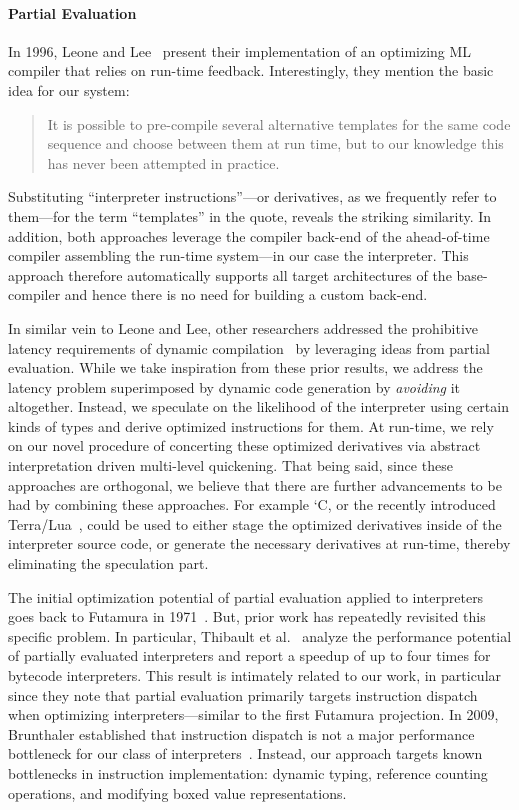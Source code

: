 \documentclass[preprint,10pt]{popl14conf}
\begin{document}
\paragraph{Partial Evaluation}
In 1996, Leone and Lee~\cite{lee.leone+96} present their implementation of an optimizing ML
compiler that relies on run-time feedback.
Interestingly, they mention the basic idea for our system:
\begin{quote}
  It is possible to pre-compile several alternative templates for the same code sequence and choose
  between them at run time, but to our knowledge this has never been attempted in practice.
\end{quote}
Substituting ``interpreter instructions''---or derivatives, as we frequently refer to them---for
the term ``templates'' in the quote, reveals the striking similarity.
In addition, both approaches leverage the compiler back-end of the ahead-of-time compiler assembling
the run-time system---in our case the interpreter.
This approach therefore automatically supports all target architectures of the base-compiler and
hence there is no need for building a custom back-end.

In similar vein to Leone and Lee, other researchers addressed the prohibitive latency requirements
of dynamic
compilation~\cite{consel.noel+96,engler.etal+96,grant.etal+97,chambers+02,philipose.etal+02} by
leveraging ideas from partial evaluation.
While we take inspiration from these prior results, we address the latency problem superimposed
by dynamic code generation by \emph{avoiding} it altogether.
Instead, we speculate on the likelihood of the interpreter using certain kinds of types and derive
optimized instructions for them.
At run-time, we rely on our novel procedure of concerting these optimized derivatives via abstract
interpretation driven multi-level quickening.
That being said, since these approaches are orthogonal, we believe that there are further
advancements to be had by combining these approaches.
For example `C, or the recently introduced Terra/Lua~\cite{devito.etal+13}, could be used to either
stage the optimized derivatives inside of the interpreter source code, or generate the necessary
derivatives at run-time, thereby eliminating the speculation part.

The initial optimization potential of partial evaluation applied to interpreters goes back to
Futamura in 1971~\cite{futamura+71}.
But, prior work has repeatedly revisited this specific problem.
In particular, Thibault et al.~\cite{thibault.etal+00} analyze the performance potential of
partially evaluated interpreters and report a speedup of up to four times for bytecode
interpreters.
This result is intimately related to our work, in particular since they note that partial evaluation
primarily targets instruction dispatch when optimizing interpreters---similar to the first Futamura
projection.
In 2009, Brunthaler established that instruction dispatch is not a major performance
bottleneck for our class of interpreters~\cite{brunthaler+09}.
Instead, our approach targets known bottlenecks in instruction implementation: dynamic typing,
reference counting operations, and modifying boxed value representations.
\end{document}
